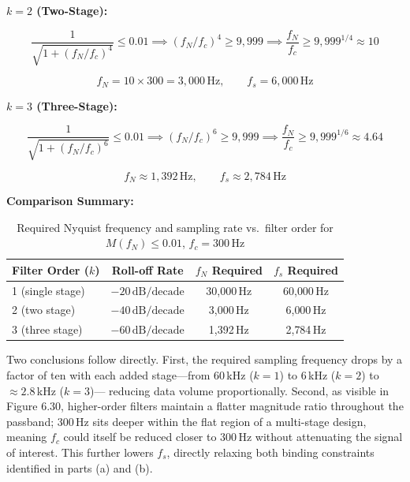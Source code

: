 \documentclass[11pt]{article}
\begin{document}
\textbf{$k = 2$ (Two-Stage):}

\[
  \frac{1}{\sqrt{1 + (f_N/f_c)^4}} \leq 0.01
  \implies
  (f_N/f_c)^4 \geq 9{,}999
  \implies
  \frac{f_N}{f_c} \geq 9{,}999^{1/4} \approx 10
\]

\[
  f_N = 10 \times 300 = 3{,}000\,\text{Hz}, \qquad f_s = 6{,}000\,\text{Hz}
\]

\textbf{$k = 3$ (Three-Stage):}

\[
  \frac{1}{\sqrt{1 + (f_N/f_c)^6}} \leq 0.01
  \implies
  (f_N/f_c)^6 \geq 9{,}999
  \implies
  \frac{f_N}{f_c} \geq 9{,}999^{1/6} \approx 4.64
\]

\[
  f_N \approx 1{,}392\,\text{Hz}, \qquad f_s \approx 2{,}784\,\text{Hz}
\]

\textbf{Comparison Summary:}

\begin{table}[H]
  \centering
  \caption{Required Nyquist frequency and sampling rate vs.\ filter order for $M(f_N) \leq 0.01$,
  $f_c = 300\,\text{Hz}$}
  \label{tab:cascade_compare}
  \begin{tabular}{lccc}
    \toprule
    \textbf{Filter Order ($k$)} & \textbf{Roll-off Rate} & \textbf{$f_N$ Required} & \textbf{$f_s$ Required} \\
    \midrule
    1 (single stage)  & $-20\,\text{dB/decade}$  & 30{,}000\,Hz & 60{,}000\,Hz \\
    2 (two stage)     & $-40\,\text{dB/decade}$  &  3{,}000\,Hz &  6{,}000\,Hz \\
    3 (three stage)   & $-60\,\text{dB/decade}$  &  1{,}392\,Hz &  2{,}784\,Hz \\
    \bottomrule
  \end{tabular}
\end{table}

Two conclusions follow directly. First, the required sampling frequency drops by a factor of ten
with each added stage---from 60\,kHz ($k=1$) to 6\,kHz ($k=2$) to $\approx 2.8$\,kHz ($k=3$)---
reducing data volume proportionally. Second, as visible in Figure 6.30, higher-order filters
maintain a flatter magnitude ratio throughout the passband; 300\,Hz sits deeper within the flat
region of a multi-stage design, meaning $f_c$ could itself be reduced closer to 300\,Hz without
attenuating the signal of interest. This further lowers $f_s$, directly relaxing both binding
constraints identified in parts (a) and (b).
\end{document}
